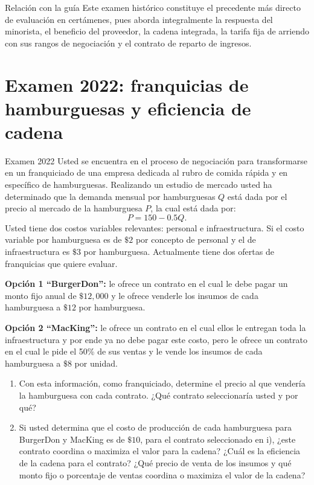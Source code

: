 \documentclass[11pt,a4paper]{article}
\begin{document}
\begin{analisis}{Relación con la guía}
Este examen histórico constituye el precedente más directo de evaluación en certámenes, pues aborda integralmente la respuesta del minorista, el beneficio del proveedor, la cadena integrada, la tarifa fija de arriendo con sus rangos de negociación y el contrato de reparto de ingresos.
\end{analisis}

\section{Examen 2022: franquicias de hamburguesas y eficiencia de cadena}

\begin{enunciado}{Examen 2022}
Usted se encuentra en el proceso de negociación para transformarse en un franquiciado de una empresa dedicada al rubro de comida rápida y en específico de hamburguesas. Realizando un estudio de mercado usted ha determinado que la demanda mensual por hamburguesas \(Q\) está dada por el precio al mercado de la hamburguesa \(P\), la cual está dada por:
\[
P=150-0.5Q.
\]
Usted tiene dos costos variables relevantes: personal e infraestructura. Si el costo variable por hamburguesa es de \(\$2\) por concepto de personal y el de infraestructura es \(\$3\) por hamburguesa. Actualmente tiene dos ofertas de franquicias que quiere evaluar.

\textbf{Opción 1 ``BurgerDon'':} le ofrece un contrato en el cual le debe pagar un monto fijo anual de \(\$12{,}000\) y le ofrece venderle los insumos de cada hamburguesa a \(\$12\) por hamburguesa.

\textbf{Opción 2 ``MacKing'':} le ofrece un contrato en el cual ellos le entregan toda la infraestructura y por ende ya no debe pagar este costo, pero le ofrece un contrato en el cual le pide el 50\% de sus ventas y le vende los insumos de cada hamburguesa a \(\$8\) por unidad.

\begin{enumerate}[label=\roman*.]
    \item Con esta información, como franquiciado, determine el precio al que vendería la hamburguesa con cada contrato. ¿Qué contrato seleccionaría usted y por qué?
    \item Si usted determina que el costo de producción de cada hamburguesa para BurgerDon y MacKing es de \(\$10\), para el contrato seleccionado en i), ¿este contrato coordina o maximiza el valor para la cadena? ¿Cuál es la eficiencia de la cadena para el contrato? ¿Qué precio de venta de los insumos y qué monto fijo o porcentaje de ventas coordina o maximiza el valor de la cadena?
\end{enumerate}
\end{enunciado}
\end{document}
